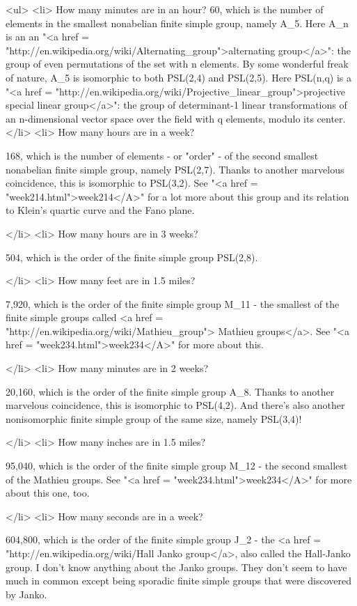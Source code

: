 <ul>
<li>
How many minutes are in an hour? 
60, which is the number of elements in the smallest nonabelian finite
simple group, namely A_{5}.  Here A_{n} is an an
"<a href =
"http://en.wikipedia.org/wiki/Alternating_group">alternating
group</a>": the group of even permutations of the set with n
elements.  By some wonderful freak of nature, A_{5} is
isomorphic to both PSL(2,4) and PSL(2,5).  Here PSL(n,q) is a "<a
href =
"http://en.wikipedia.org/wiki/Projective_linear_group">projective
special linear group</a>": the group of determinant-1 linear
transformations of an n-dimensional vector space over the field with q
elements, modulo its center.
</li>
<li>
How many hours are in a week?  

168, which is the number of elements - or "order" - of the second
smallest nonabelian finite simple group, namely PSL(2,7).  Thanks to
another marvelous coincidence, this is isomorphic to PSL(3,2).  See
"<a href = "week214.html">week214</A>" for a lot more about this group and its relation to Klein's
quartic curve and the Fano plane.

</li>
<li>
How many hours are in 3 weeks?  

504, which is the order of the finite simple group PSL(2,8).

</li>
<li>
How many feet are in 1.5 miles?  

7,920, which is the order of the finite simple group M_{11} - the
smallest of the finite simple groups called <a href =
"http://en.wikipedia.org/wiki/Mathieu_group"> Mathieu groups</a>.  See
"<a href = "week234.html">week234</A>" for more about this.

</li>
<li>
How many minutes are in 2 weeks?   

20,160, which is the order of the finite simple group A_{8}.
Thanks to another marvelous coincidence, this is isomorphic to
PSL(4,2).  And there's also another nonisomorphic finite simple group
of the same size, namely PSL(3,4)!

</li>
<li>
How many inches are in 1.5 miles?  

95,040, which is the order of the finite simple group M_{12} -
the second smallest of the Mathieu groups.  See
"<a href = "week234.html">week234</A>" for more about this
one, too.

</li>
<li>
How many seconds are in a week?  

604,800, which is the order of the finite simple group J_{2} -
the <a href = "http://en.wikipedia.org/wiki/Hall%
Janko group</a>, also called the Hall-Janko group.  I don't know anything about
the Janko groups.  They don't seem to have much in common except being
sporadic finite simple groups that were discovered by Janko. 

